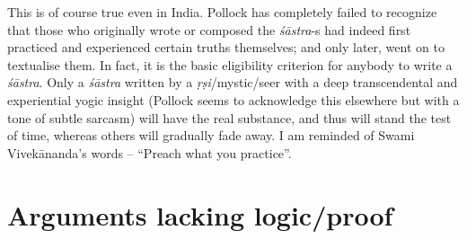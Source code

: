 This is of course true even in India. Pollock has completely failed to recognize that those who originally wrote or composed the {\it śāstra}-s had indeed first practiced and experienced certain truths themselves; and only later, went on to textualise them. In fact, it is the basic eligibility criterion for anybody to write a {\it śāstra}. Only a {\it śāstra} written by a {\it ṛṣi}/mystic/seer with a deep transcendental and experiential yogic insight (Pollock seems to acknowledge this elsewhere but with a tone of subtle sarcasm) will have the real substance, and thus will stand the test of time, whereas others will gradually fade away. I am reminded of Swami Vivekānanda's  words -- ``Preach what you practice''.

\section*{Arguments lacking logic/proof}


